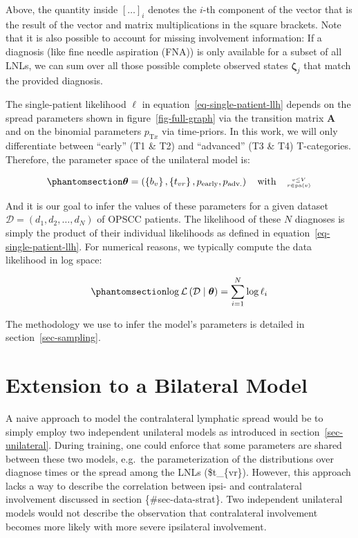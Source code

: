 \documentclass[
  sn-mathphys-num,
]{sn-jnl}
\begin{document}
Above, the quantity inside \(\left[ \ldots \right]_i\) denotes the
\(i\)-th component of the vector that is the result of the vector and
matrix multiplications in the square brackets. Note that it is also
possible to account for missing involvement information: If a diagnosis
(like fine needle aspiration (FNA)) is only available for a subset of
all LNLs, we can sum over all those possible complete observed states
\(\boldsymbol{\zeta}_j\) that match the provided diagnosis.

The single-patient likelihood \(\ell\) in
equation~\ref{eq-single-patient-llh} depends on the spread parameters
shown in figure~\ref{fig-full-graph} via the transition matrix
\(\mathbf{A}\) and on the binomial parameters \(p_{\text{T}x}\) via
time-priors. In this work, we will only differentiate between ``early''
(T1 \& T2) and ``advanced'' (T3 \& T4) T-categories. Therefore, the
parameter space of the unilateral model is:

\begin{equation}\phantomsection\label{eq-param-space}{
\boldsymbol{\theta} = \left( \left\{ b_v \right\}, \left\{ t_{vr} \right\}, p_\text{early}, p_\text{adv.} \right) \quad \text{with} \quad \genfrac{}{}{0pt}{2}{v\leq V}{r\in\operatorname{pa}(v)}
}\end{equation}

And it is our goal to infer the values of these parameters for a given
dataset \(\mathcal{D} = \left( d_1, d_2, \ldots, d_N \right)\) of OPSCC
patients. The likelihood of these \(N\) diagnoses is simply the product
of their individual likelihoods as defined in
equation~\ref{eq-single-patient-llh}. For numerical reasons, we
typically compute the data likelihood in log space:

\begin{equation}\phantomsection\label{eq-log-likelihood}{
\log \mathcal{L} \left( \mathcal{D} \mid \boldsymbol{\theta} \right) = \sum_{i=1}^N \log \ell_i
}\end{equation}

The methodology we use to infer the model's parameters is detailed in
section~\ref{sec-sampling}.

\section{Extension to a Bilateral Model}\label{sec-ext-to-contra}

A naive approach to model the contralateral lymphatic spread would be to
simply employ two independent unilateral models as introduced in
section~\ref{sec-unilateral}. During training, one could enforce that
some parameters are shared between these two models, e.g.~the
parameterization of the distributions over diagnose times or the spread
among the LNLs (\$t\_\{vr\}). However, this approach lacks a way to
describe the correlation between ipsi- and contralateral involvement
discussed in section \{\#sec-data-strat\}. Two independent unilateral
models would not describe the observation that contralateral involvement
becomes more likely with more severe ipsilateral involvement.
\end{document}
